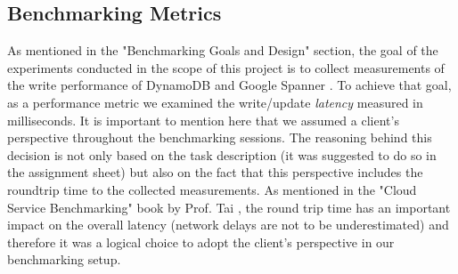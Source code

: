 \documentclass[letterpaper, 10 pt, conference]{ieeeconf}  %
\begin{document}
\subsection{Benchmarking Metrics}
As mentioned in the "Benchmarking Goals and Design" section, the goal of the experiments conducted in the scope of this project is to collect measurements of the write performance of DynamoDB \cite{DynamoWebPage} and Google Spanner \cite{SpannerWebPage}. To achieve that goal, as a performance metric we examined the write/update \textit{latency} measured in milliseconds. It is important to mention here that we assumed a client's perspective throughout the benchmarking sessions. The reasoning behind this decision is not only based on the task description (it was suggested to do so in the assignment sheet) but also on the fact that this perspective includes the roundtrip time to the collected measurements. As mentioned in the "Cloud Service Benchmarking" book by Prof. Tai \cite{StefanTaiBook}, the round trip time has an important impact on the overall latency (network delays are not to be underestimated) and therefore it was a logical choice to adopt the client's perspective in our benchmarking setup.
\end{document}

